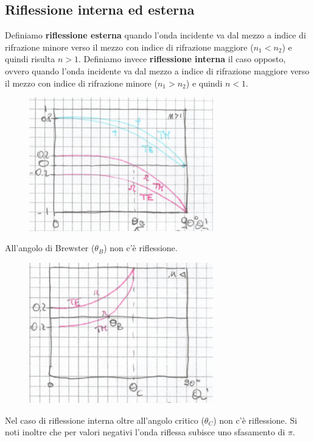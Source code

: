 \documentclass{article}
\begin{document}
\subsection{Riflessione interna ed esterna}
Definiamo \textbf{riflessione esterna} quando l'onda incidente va dal mezzo a indice di rifrazione minore verso il mezzo con indice di rifrazione maggiore (\textbf{$n_1 < n_2$}) e quindi risulta \textbf{$n > 1$}.
Definiamo invece \textbf{riflessione interna} il caso opposto, ovvero quando l'onda incidente va dal mezzo a indice di rifrazione maggiore verso il mezzo con indice di rifrazione minore (\textbf{$n_1 > n_2$}) e quindi \textbf{$n < 1$}.

\begin{figure}[H]
\includegraphics[width=8cm]{images/coeff_r_t_ext_rifl.png}
\centering
\end{figure}
\noindent
All'angolo di Brewster ($\theta_B$) non c'è riflessione.

\begin{figure}[H]
\includegraphics[width=8cm]{images/coeff_r_int_rifl.png}
\centering
\end{figure}
\noindent
Nel caso di riflessione interna oltre all'angolo critico ($\theta_C$) non c'è riflessione.
Si noti inoltre che per valori negativi l'onda riflessa subisce uno sfasamento di $\pi$.\\
\end{document}
